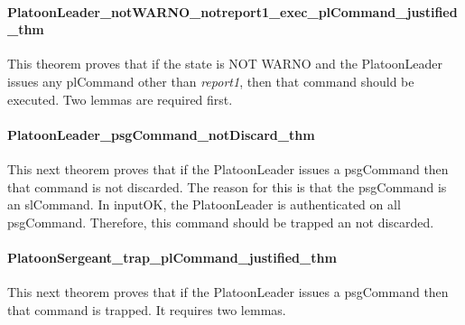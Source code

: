 \documentclass[../../main/main.tex]{subfiles}
\begin{document}
\paragraph*{PlatoonLeader_notWARNO_notreport1_exec_plCommand_justified_thm}
This theorem proves that if the state is NOT WARNO and the PlatoonLeader issues any plCommand other than \textit{report1}, then that command should be executed.  Two lemmas are required first.

\HOLssmPlanPBTheoremsPlatoonLeaderXXnotWARNOXXnotreportOneXXexecXXplCommandXXlemma

\HOLssmPlanPBTheoremsPlatoonLeaderXXnotWARNOXXnotreportOneXXexecXXplCommandXXjustifiedXXlemma

\HOLssmPlanPBTheoremsPlatoonLeaderXXnotWARNOXXnotreportOneXXexecXXplCommandXXjustifiedXXthm

\paragraph*{PlatoonLeader_psgCommand_notDiscard_thm}
This next theorem proves that if the PlatoonLeader issues a psgCommand then that command is not discarded.  The reason for this is that the psgCommand is an slCommand.  In inputOK, the PlatoonLeader is authenticated on all psgCommand.  Therefore, this command should be trapped an not discarded.

\HOLssmPlanPBTheoremsPlatoonLeaderXXpsgCommandXXnotDiscardXXthm


\paragraph*{PlatoonSergeant_trap_plCommand_justified_thm}
This next theorem proves that if the PlatoonLeader issues a psgCommand then that command is trapped.  It requires two lemmas.

\HOLssmPlanPBTheoremsPlatoonLeaderXXtrapXXpsgCommandXXlemma

\HOLssmPlanPBTheoremsPlatoonLeaderXXtrapXXpsgCommandXXjustifiedXXlemma

\HOLssmPlanPBTheoremsPlatoonSergeantXXtrapXXplCommandXXjustifiedXXthm
\end{document}
